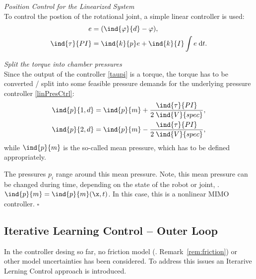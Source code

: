 \documentclass[conference]{IEEEtran}
\newcommand{\vp}{\varphi}
\newcommand{\vpd}{\ind{\vp}{d}}
\begin{document}
\emph{Position Control for the Linearized System}\\[1pt]
To control the postion of the rotational joint, a simple linear controller is used:
\begin{subequations}\label{taupi}
  \begin{align}
               e &= (\vpd-\vp), \\
  \ind{\tau}{PI} &= \ind{k}{p} e + \ind{k}{I}\int e \; \mathrm{d}t. 
 \end{align}
\end{subequations}

\emph{Split the torque into chamber pressures}\\[1pt]
Since the output of the controller \eqref{taupi} is a torque, the
torque has to be converted / split into some feasible pressure demands for the
underlying pressure controller \eqref{linPresCtrl}:
\begin{subequations}\label{tau2pd}
  \begin{align}
               \ind{p}{1,d} &= \ind{p}{m} + \frac{\ind{\tau}{PI}}{2\;\ind{V}{spec}},\\
               \ind{p}{2,d} &= \ind{p}{m} - \frac{\ind{\tau}{PI}}{2\;\ind{V}{spec}},
 \end{align}
\end{subequations}
while $\ind{p}{m}$ is the so-called mean pressure, which has to be
defined appropriately.
\begin{Remark}\label{rem:pm}
  The pressures $p_i$ range around this mean pressure. Note, this mean
  pressure can be changed during time, depending on the state of the
  robot or joint, \ie. $\ind{p}{m} = \ind{p}{m}(\x,t)$. In this case,
  this is a nonlinear MIMO controller. \hfill$\square$
\end{Remark}

\subsection{Iterative Learning Control -- Outer Loop}
In the controller desing so far, no friction model
(\cf. Remark~\ref{rem:friction}) or other model uncertainties has been
considered. To address this issues an Iterarive Lerning Control approach
is introduced.
\end{document}
